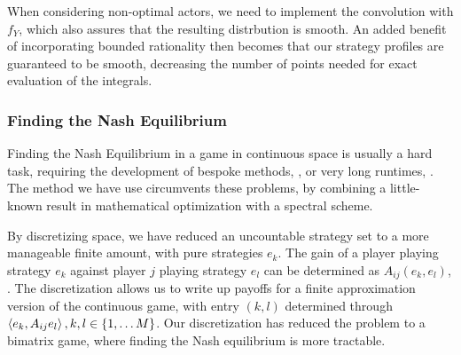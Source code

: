When considering non-optimal actors, we need to implement the convolution with $f_Y$, which also assures that the resulting distrbution is smooth. An added benefit of incorporating bounded rationality then becomes that our strategy profiles are guaranteed to be smooth, decreasing the number of points needed for exact evaluation of the integrals.


\subsubsection*{Finding the Nash Equilibrium}
Finding the Nash Equilibrium in a game in continuous space is usually a hard task, requiring the development of bespoke methods, \citep{verticalmigration}, or very long runtimes, \citep{jerome}. The method we have use circumvents these problems, by combining a little-known result in mathematical optimization with a spectral scheme.

By discretizing space, we have reduced an uncountable strategy set to a more manageable finite amount, with pure strategies $e_k$. The gain of a player playing strategy $e_k$ against player $j$ playing strategy $e_l$ can be determined as $A_{ij}(e_k,e_l)$, . The discretization allows us to write up payoffs for a finite approximation version of the continuous game,  with entry $(k,l)$ determined through $\left \langle e_k,A_{ij}e_l \right \rangle, k,l \in \{1,\dots M\}$.
Our discretization has reduced the problem to a bimatrix game, where finding the Nash equilibrium is more tractable.

